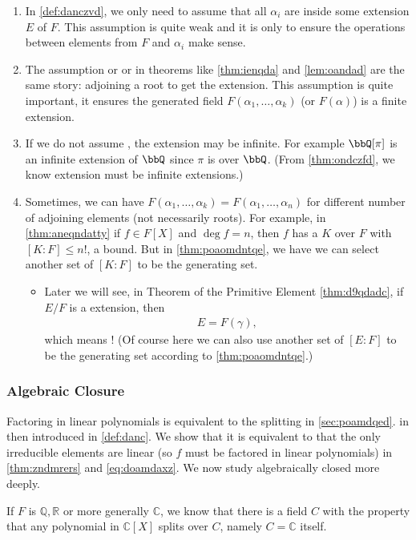 \documentclass{article}
\begin{document}
\begin{enumerate}
\item In \cref{def:danczvd}, we only need to assume that all $\alpha_i$  are inside some extension $E$ of $F$. This assumption is quite weak and it is only to ensure the operations between elements from $F$ and $\alpha_i$ make sense.
\item The assumption  or  or  in theorems like \cref{thm:ienqda} and \cref{lem:oandad} are the same story: adjoining a root to get the extension. This assumption is quite important, it ensures the generated field $F(\alpha_1,\ldots,\alpha_k)$ (or $F(\alpha)$) is a finite extension. 
    \item If we do not assume , the extension may be infinite. For example $\bbQ[\pi]$ is an infinite extension of $\bbQ$ since $\pi$ is  over $\bbQ$. (From \cref{thm:ondczfd}, we know   extension must be infinite extensions.)
    \item Sometimes, we can have $F(\alpha_1,\ldots,\alpha_k)=F(\alpha_1,\ldots,\alpha_n)$ for different number of adjoining elements (not necessarily roots). For example, in \cref{thm:aneqndatty}
 if $f \in F[X]$ and $\operatorname{deg} f=n$, then $f$ has a  $K$ over $F$ with $[K: F] \leq n !$, a  bound. But in \cref{thm:poaomdntqe}, we have we can select another set of $[K: F]$ to be the generating set.
 \begin{itemize}
     \item Later we will see, in Theorem of the Primitive Element \cref{thm:d9qdadc}, if $E / F$ is a  extension, then
\begin{align*}
E=F(\gamma),
\end{align*}
which means ! (Of course here we can also use another set of $[E: F]$ to be the generating set according to \cref{thm:poaomdntqe}.)
 \end{itemize}

\end{enumerate}

\subsubsection{Algebraic Closure}
Factoring in linear polynomials is equivalent to the splitting in \cref{sec:poamdqed}.   in then introduced in \cref{def:danc}. We show that it is equivalent to that the only irreducible elements are linear (so $f$ must be factored in linear polynomials) in \cref{thm:zndmrers} and \cref{eq:doamdaxz}. We now study algebraically closed more deeply.  
\begin{exma}
 If $F$ is $\mathbb{Q}, \mathbb{R}$ or more generally $\mathbb{C}$, we know that there is a field $C$ with the property that any polynomial in $\mathbb{C}[X]$ splits over $C$, namely $C=\mathbb{C}$ itself. 
\end{exma}
\end{document}
